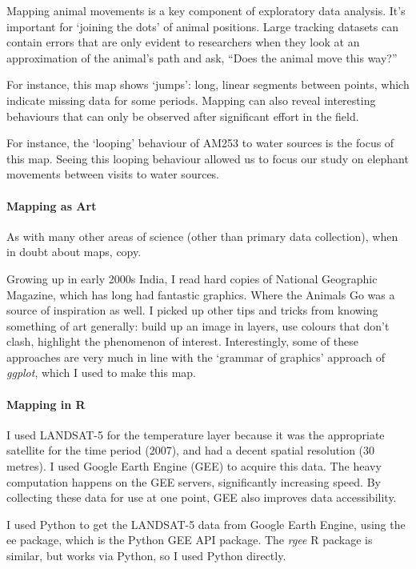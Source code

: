 	Mapping animal movements is a key component of exploratory data analysis. It's important for `joining the dots' of animal positions. Large tracking datasets can contain errors that are only evident to researchers when they look at an approximation of the animal's path and ask, “Does the animal move this way?”

	For instance, this map shows `jumps': long, linear segments between points, which indicate missing data for some periods. Mapping can also reveal interesting behaviours that can only be observed after significant effort in the field.

	For instance, the `looping' behaviour of AM253 to water sources is the focus of this map. Seeing this looping behaviour allowed us to focus our study on elephant movements between visits to water sources.

	\paragraph*{Mapping as Art}

	As with many other areas of science (other than primary data collection), when in doubt about maps, copy.

	Growing up in early 2000s India, I read hard copies of National Geographic Magazine, which has long had fantastic graphics. Where the Animals Go was a source of inspiration as well. I picked up other tips and tricks from knowing something of art generally: build up an image in layers, use colours that don't clash, highlight the phenomenon of interest. Interestingly, some of these approaches are very much in line with the `grammar of graphics' approach of \textit{ggplot}, which I used to make this map.

	\paragraph*{Mapping in R}

	I used LANDSAT-5 for the temperature layer because it was the appropriate satellite for the time period (2007), and had a decent spatial resolution (30 metres). I used Google Earth Engine (GEE) to acquire this data. The heavy computation happens on the GEE servers, significantly increasing speed. By collecting these data for use at one point, GEE also improves data accessibility.

	I used Python to get the LANDSAT-5 data from Google Earth Engine, using the ee package, which is the Python GEE API package. The \textit{rgee} R package is similar, but works via Python, so I used Python directly.

